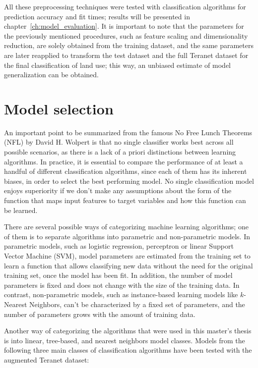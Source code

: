 All these preprocessing techniques were tested with classification algorithms for prediction accuracy and fit times;
results will be presented in chapter~\ref{ch:model_evaluation}.
It is important to note that the parameters for the previously mentioned procedures, such as feature scaling and dimensionality reduction, are solely obtained from the training dataset, and the same parameters are later reapplied to transform the test dataset and the full Teranet dataset for the final classification of land use;
this way, an unbiased estimate of model generalization can be obtained.

\section{Model selection} \label{sec:model_selection}

An important point to be summarized from the famous No Free Lunch Theorems (NFL)\cite{Wolpert1996,Wolpert1997} by David H. Wolpert is that no single classifier works best across all possible scenarios, as there is a lack of a priori distinctions between learning algorithms.
In practice, it is essential to compare the performance of at least a handful of different classification algorithms, since each of them has its inherent biases, in order to select the best performing model.
No single classification model enjoys superiority if we don't make any assumptions about the form of the function that maps input features to target variables and how this function can be learned\cite{RaschkaMirjalili2017}.

There are several possible ways of categorizing machine learning algorithms;
one of them is to separate algorithms into parametric and non-parametric models.
In parametric models, such as logistic regression, perceptron or linear Support Vector Machine (SVM), model parameters are estimated from the training set to learn a function that allows classifying new data without the need for the original training set, once the model has been fit.
In addition, the number of model parameters is fixed and does not change with the size of the training data.
In contrast, non-parametric models, such as instance-based learning models like $k$-Nearest Neighbors, can't be characterized by a fixed set of parameters, and the number of parameters grows with the amount of training data.

Another way of categorizing the algorithms that were used in this master's thesis is into linear, tree-based, and nearest neighbors model classes.
Models from the following three main classes of classification algorithms have been tested with the augmented Teranet dataset:

